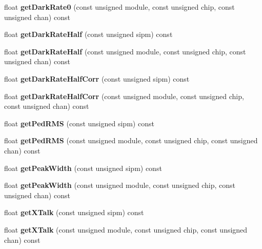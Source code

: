 \begin{DoxyCompactItemize}
\item 
float {\bfseries get\-Dark\-Rate0} (const unsigned module, const unsigned chip, const unsigned chan) const \label{classCALICE_1_1SiPmPropertiesProcessor_a8dda757457c5f5f7be9cbe82a31c611e}

\item 
float {\bfseries get\-Dark\-Rate\-Half} (const unsigned sipm) const \label{classCALICE_1_1SiPmPropertiesProcessor_af67aa9d6cd8306769a804d329092e997}

\item 
float {\bfseries get\-Dark\-Rate\-Half} (const unsigned module, const unsigned chip, const unsigned chan) const \label{classCALICE_1_1SiPmPropertiesProcessor_a51b2b403c16e111b0074849370609d4d}

\item 
float {\bfseries get\-Dark\-Rate\-Half\-Corr} (const unsigned sipm) const \label{classCALICE_1_1SiPmPropertiesProcessor_ac01a00304f1671020af7089dd869a63c}

\item 
float {\bfseries get\-Dark\-Rate\-Half\-Corr} (const unsigned module, const unsigned chip, const unsigned chan) const \label{classCALICE_1_1SiPmPropertiesProcessor_afeb80918c3af62a8ea86bd10afb28164}

\item 
float {\bfseries get\-Ped\-R\-M\-S} (const unsigned sipm) const \label{classCALICE_1_1SiPmPropertiesProcessor_a10069f2e761eeab5b2f8a5b46de4a7c1}

\item 
float {\bfseries get\-Ped\-R\-M\-S} (const unsigned module, const unsigned chip, const unsigned chan) const \label{classCALICE_1_1SiPmPropertiesProcessor_abd317d4bf9019e63864b41945a08c5b4}

\item 
float {\bfseries get\-Peak\-Width} (const unsigned sipm) const \label{classCALICE_1_1SiPmPropertiesProcessor_a122927747aaaf7962f73950415e69be2}

\item 
float {\bfseries get\-Peak\-Width} (const unsigned module, const unsigned chip, const unsigned chan) const \label{classCALICE_1_1SiPmPropertiesProcessor_a821960e9dea7268b585c04af86278729}

\item 
float {\bfseries get\-X\-Talk} (const unsigned sipm) const \label{classCALICE_1_1SiPmPropertiesProcessor_a49ccb27604b3989489866b70385a9c38}

\item 
float {\bfseries get\-X\-Talk} (const unsigned module, const unsigned chip, const unsigned chan) const \label{classCALICE_1_1SiPmPropertiesProcessor_a9a89b6008d0d60bb0b60b6b9d266d236}


\end{DoxyCompactItemize}
